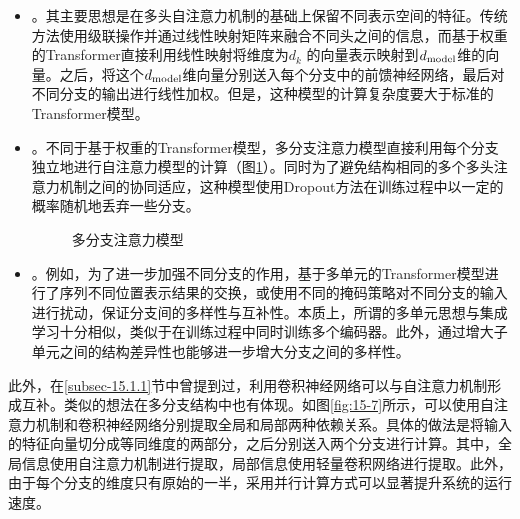 \begin{itemize}
\vspace{0.5em}
\item {\small{}}。其主要思想是在多头自注意力机制的基础上保留不同表示空间的特征。传统方法使用级联操作并通过线性映射矩阵来融合不同头之间的信息，而基于权重的Transformer直接利用线性映射将维度为$d_k$ 的向量表示映射到$d_{\rm model}$维的向量。之后，将这个$d_{\rm model}$维向量分别送入每个分支中的前馈神经网络，最后对不同分支的输出进行线性加权。但是，这种模型的计算复杂度要大于标准的Transformer模型。
\vspace{0.5em}
\item {\small{}}。不同于基于权重的Transformer模型，多分支注意力模型直接利用每个分支独立地进行自注意力模型的计算（图\ref{fig:15-6}）。同时为了避免结构相同的多个多头注意力机制之间的协同适应，这种模型使用Dropout方法在训练过程中以一定的概率随机地丢弃一些分支。

\begin{figure}[htp]
\centering

\caption{多分支注意力模型}
\label{fig:15-6}
\end{figure}

\vspace{0.5em}
\item {\small{}}。例如，为了进一步加强不同分支的作用，基于多单元的Transformer模型进行了序列不同位置表示结果的交换，或使用不同的掩码策略对不同分支的输入进行扰动，保证分支间的多样性与互补性。本质上，所谓的多单元思想与集成学习十分相似，类似于在训练过程中同时训练多个编码器。此外，通过增大子单元之间的结构差异性也能够进一步增大分支之间的多样性。
\vspace{0.5em}
\end{itemize}

\parinterval 此外，在\ref{subsec-15.1.1}节中曾提到过，利用卷积神经网络可以与自注意力机制形成互补。类似的想法在多分支结构中也有体现。如图\ref{fig:15-7}所示，可以使用自注意力机制和卷积神经网络分别提取全局和局部两种依赖关系。具体的做法是将输入的特征向量切分成等同维度的两部分，之后分别送入两个分支进行计算。其中，全局信息使用自注意力机制进行提取，局部信息使用轻量卷积网络进行提取。此外，由于每个分支的维度只有原始的一半，采用并行计算方式可以显著提升系统的运行速度。

